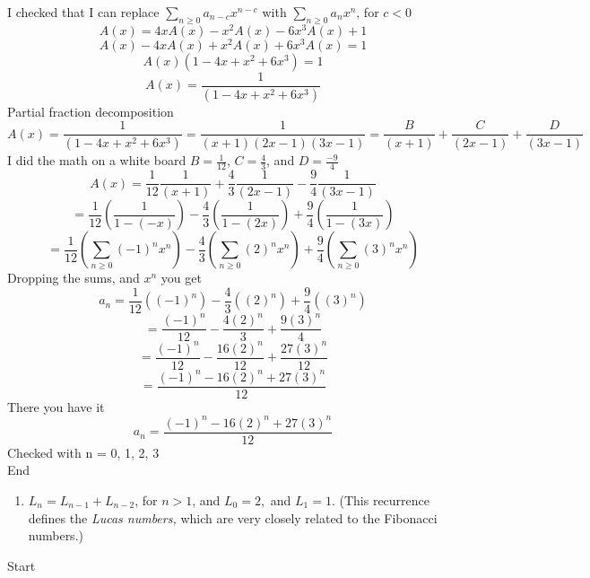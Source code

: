 \documentclass[10pt, AMS Euler]{article}
\begin{document}
\begin{enumerate}
                I checked that I can replace $\sum_{n\geq0} a_{n-c} x^{n-c}$ with $\sum_{n\geq0} a_n x^n$, for $c < 0 $
                $$ A(x) = 4x A(x) - x^2 A(x) - 6x^3 A(x) + 1 $$
                $$ A(x) - 4x A(x) + x^2 A(x) + 6x^3 A(x) = 1 $$
                $$ A(x)( 1 - 4x + x^2 + 6x^3 ) = 1 $$
                $$ A(x) = \frac{1}{( 1 - 4x + x^2 + 6x^3 )} $$
                Partial fraction decomposition
                $$ A(x) = \frac{1}{( 1 - 4x + x^2 + 6x^3 )} = \frac{1}{(x+1)(2x-1)(3x-1)} = \frac{B}{(x+1)} + \frac{C}{(2x-1)} + \frac{D}{(3x-1)} $$
                I did the math on a white board $B=\frac{1}{12}$, $C=\frac{4}{3}$, and $D=\frac{-9}{4}$
                $$ A(x) = \frac{1}{12} \frac{1}{(x+1)} + \frac{4}{3} \frac{1}{(2x-1)} - \frac{9}{4} \frac{1}{(3x-1)} $$
                $$ = \frac{1}{12} (\frac{1}{1-(-x)}) - \frac{4}{3} (\frac{1}{1-(2x)}) + \frac{9}{4} (\frac{1}{1-(3x)}) $$
                $$ = \frac{1}{12} ( \sum_{n\geq0} (-1)^n x^n ) - \frac{4}{3} ( \sum_{n\geq0} (2)^n x^n ) + \frac{9}{4} ( \sum_{n\geq0} (3)^n x^n ) $$
                Dropping the sums, and $x^n$ you get
                $$ a_n = \frac{1}{12} ( (-1)^n ) - \frac{4}{3} ( (2)^n ) + \frac{9}{4} ( (3)^n ) $$
                $$ = \frac{(-1)^n}{12} - \frac{4(2)^n}{3} + \frac{9(3)^n}{4} $$
                $$ = \frac{(-1)^n}{12} - \frac{16(2)^n}{12} + \frac{27(3)^n}{12} $$
                $$ = \frac{(-1)^n - 16(2)^n + 27(3)^n}{12} $$
                There you have it
                $$ a_n = \frac{(-1)^n - 16(2)^n + 27(3)^n}{12} $$
                Checked with n = 0, 1, 2, 3 \\
                
                End
                
                \newpage
                \begin{enumerate}[resume]
			\item $L_n = L_{n-1} + L_{n-2}$, for $n > 1$, and $L_0 = 2,$ and $L_1= 1$. (This recurrence defines the 
			\emph{Lucas numbers,} which are very closely related to the Fibonacci numbers.)
		      \end{enumerate} 

                Start \\


\end{enumerate}
\end{document}
